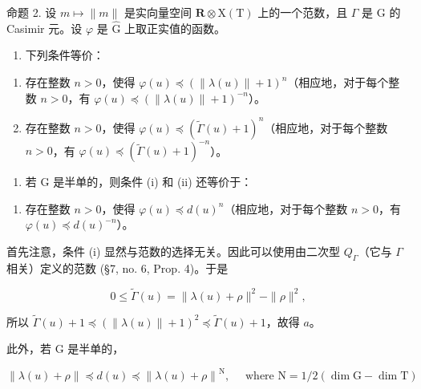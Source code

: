 命题 2. 设 \(m \mapsto \|m\|\) 是实向量空间 \(\mathbf{R} \otimes \mathrm{X(T)}\) 上的一个范数，且 \(\Gamma\) 是 G 的 Casimir 元。设 \(\varphi\) 是 \(\hat{\mathrm{G}}\) 上取正实值的函数。

\begin{enumerate}
\def\labelenumi{\alph{enumi})}
\tightlist
\item
  下列条件等价：
\end{enumerate}

\begin{enumerate}
\def\labelenumi{(\roman{enumi})}
\item
  存在整数 \(n > 0\)，使得 \(\varphi(u) \preccurlyeq (\|\lambda(u)\| + 1)^n\)（相应地，对于每个整数 \(n > 0\)，有 \(\varphi(u) \preccurlyeq (\|\lambda(u)\| + 1)^{-n}\)）。
\item
  存在整数 \(n > 0\)，使得 \(\varphi(u) \preccurlyeq (\tilde{\Gamma}(u) + 1)^n\)（相应地，对于每个整数 \(n > 0\)，有 \(\varphi(u) \preccurlyeq (\tilde{\Gamma}(u) + 1)^{-n}\)）。
\end{enumerate}

\begin{enumerate}
\def\labelenumi{\alph{enumi})}
\setcounter{enumi}{1}
\tightlist
\item
  若 \(\mathrm{G}\) 是半单的，则条件 (i) 和 (ii) 还等价于：
\end{enumerate}

\begin{enumerate}
\def\labelenumi{(\roman{enumi})}
\setcounter{enumi}{2}
\tightlist
\item
  存在整数 \(n > 0\)，使得 \(\varphi(u) \preccurlyeq d(u)^n\)（相应地，对于每个整数 \(n > 0\)，有 \(\varphi(u) \preccurlyeq d(u)^{-n}\)）。
\end{enumerate}

首先注意，条件 (i) 显然与范数的选择无关。因此可以使用由二次型 \(Q_{\varGamma}\)（它与 \(\varGamma\) 相关）定义的范数 (§7, no. 6, Prop. 4)。于是

\[
0 \leq \tilde {\Gamma} (u) = \| \lambda (u) + \rho \| ^ {2} - \| \rho \| ^ {2},
\]

所以 \(\tilde{\Gamma}(u) + 1 \preccurlyeq (\|\lambda(u)\| + 1)^2 \preccurlyeq \tilde{\Gamma}(u) + 1\)，故得 \(a\)。

此外，若 G 是半单的，

\[
\left\| \lambda (u) + \rho \right\| \preccurlyeq d (u) \preccurlyeq \left\| \lambda (u) + \rho \right\| ^ {\mathrm{N}}, \quad \text { where } \mathrm{N} = 1 / 2 (\dim \mathrm{G} - \dim \mathrm{T})
\]

